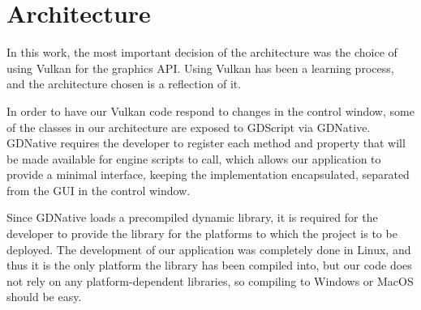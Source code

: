 \section{Architecture}
In this work, the most important decision of the architecture was the choice of using Vulkan for the graphics API. Using Vulkan has been a learning process, and the architecture chosen is a reflection of it.

In order to have our Vulkan code respond to changes in the control window, some of the classes in our architecture are exposed to GDScript via GDNative. GDNative requires the developer to register each method and property that will be made available for engine scripts to call, which allows our application to provide a minimal interface, keeping the implementation encapsulated, separated from the GUI in the control window.

Since GDNative loads a precompiled dynamic library, it is required for the developer to provide the library for the platforms to which the project is to be deployed. The development of our application was completely done in Linux, and thus it is the only platform the library has been compiled into, but our code does not rely on any platform-dependent libraries, so compiling to Windows or MacOS should be easy.












